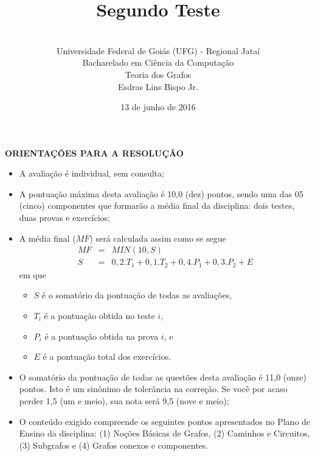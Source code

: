 \documentclass[12pt,a4paper,oneside]{article}
\author{\\Universidade Federal de Goiás (UFG) - Regional Jataí\\Bacharelado em Ciência da Computação \\Teoria dos Grafos \\Esdras Lins Bispo Jr.}
\title{\sc \huge Segundo Teste}
\date{13 de junho de 2016}
\begin{document}
\maketitle

{\bf ORIENTAÇÕES PARA A RESOLUÇÃO}

\footnotesize

\begin{itemize}
	\item A avaliação é individual, sem consulta;
	\item A pontuação máxima desta avaliação é 10,0 (dez) pontos, sendo uma das 05 (cinco) componentes que formarão a média final da disciplina: dois testes, duas provas e exercícios;
	\item A média final ($MF$) será calculada assim como se segue
	\begin{eqnarray}
		MF & = & MIN(10, S) \nonumber \\
		S & = & 0,2.T_1 + 0,1.T_2 + 0,4.P_1 + 0,3.P_2 + E \nonumber
	\end{eqnarray}
	em que 
	\begin{itemize}
		\item $S$ é o somatório da pontuação de todas as avaliações,
		\item $T_i$ é a pontuação obtida no teste $i$,
		\item $P_i$ é a pontuação obtida na prova $i$, e
		\item $E$ é a pontuação total dos exercícios.
	\end{itemize}
	\item O somatório da pontuação de todas as questões desta avaliação é 11,0 (onze) pontos. Isto é um sinônimo de tolerância na correção. Se você por acaso perder 1,5 (um e meio), sua nota será 9,5 (nove e meio);
	\item O conteúdo exigido compreende os seguintes pontos apresentados no Plano de Ensino da disciplina: (1) Noções Básicas de Grafos, (2) Caminhos e Circuitos, (3) Subgrafos e (4) Grafos conexos e componentes.
\end{itemize}

\begin{center}
\end{center}

\newpage

\normalsize
\end{document}
